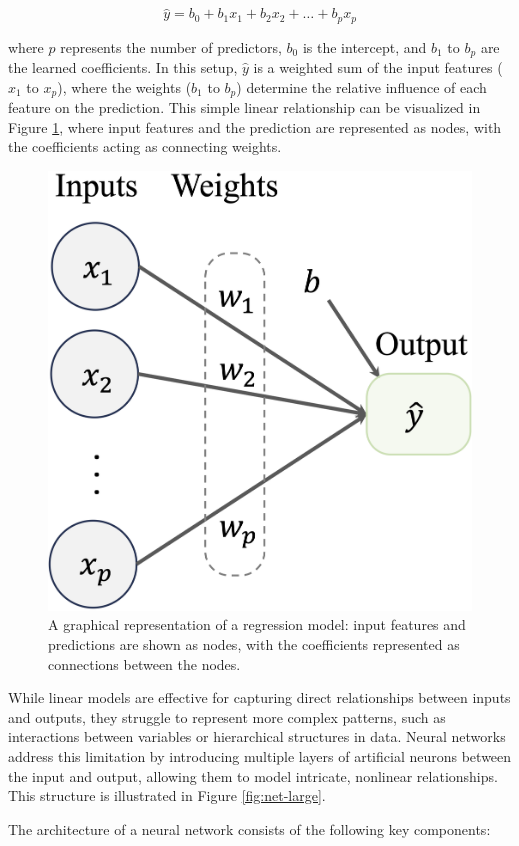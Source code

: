 \documentclass[
]{book}
\theoremstyle{definition}
\theoremstyle{definition}
\theoremstyle{definition}
\theoremstyle{definition}
\theoremstyle{remark}
\begin{document}
\[
\hat{y} = b_0 + b_1 x_1 + b_2 x_2 + \dots + b_p x_p
\]

where \(p\) represents the number of predictors, \(b_0\) is the intercept, and \(b_1\) to \(b_p\) are the learned coefficients. In this setup, \(\hat{y}\) is a weighted sum of the input features (\(x_1\) to \(x_p\)), where the weights (\(b_1\) to \(b_p\)) determine the relative influence of each feature on the prediction. This simple linear relationship can be visualized in Figure \ref{fig:net-reg}, where input features and the prediction are represented as nodes, with the coefficients acting as connecting weights.

\begin{figure}

{\centering \includegraphics[width=0.4\linewidth]{images/ch12_net_reg} 

}

\caption{A graphical representation of a regression model: input features and predictions are shown as nodes, with the coefficients represented as connections between the nodes.}\label{fig:net-reg}
\end{figure}

While linear models are effective for capturing direct relationships between inputs and outputs, they struggle to represent more complex patterns, such as interactions between variables or hierarchical structures in data. Neural networks address this limitation by introducing multiple layers of artificial neurons between the input and output, allowing them to model intricate, nonlinear relationships. This structure is illustrated in Figure \ref{fig:net-large}.

The architecture of a neural network consists of the following key components:
\end{document}
